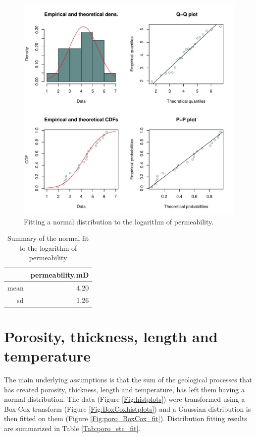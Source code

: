 \documentclass[review,authoryear, 12pt]{elsarticle}\usepackage[]{graphicx}\usepackage[]{color}
\makeatletter
\def\maxwidth{ %
  \ifdim\Gin@nat@width>\linewidth
    \linewidth
  \else
    \Gin@nat@width
  \fi
}
\newenvironment{knitrout}{}{} %
\makeatother
\begin{document}
\begin{knitrout}
\color{fgcolor}\begin{figure}[]

\includegraphics[width=\maxwidth]{figure/perm_fit} \caption[Fitting a normal distribution to the logarithm of permeability]{Fitting a normal distribution to the logarithm of permeability.\label{Fig:perm_fit}}
\end{figure}


\end{knitrout}


\begin{table}[ht]
\centering
\begin{tabular}{rr}
  \hline
 & permeability.mD \\ 
  \hline
mean & 4.20 \\ 
  sd & 1.26 \\ 
   \hline
\end{tabular}
\caption{{Summary of the normal fit to the logarithm of permeability}} 
\label{Tab:Permfit}
\end{table}


\pagebreak


\section{Porosity, thickness, length and temperature}
The main underlying assumptions is that the sum of the geological processes that has created porosity, thickness, length and temperature, has left them having a normal distribution. The data (Figure \ref{Fig:histplots}) were transformed using a Box-Cox transform (Figure \ref{Fig:BoxCoxhistplots}) and a Gaussian distribution is then fitted on them (Figure \ref{Fig:poro_BoxCox_fit}). Distribution fitting results are summarized in Table \ref{Tab:poro_etc_fit}.
\end{document}
